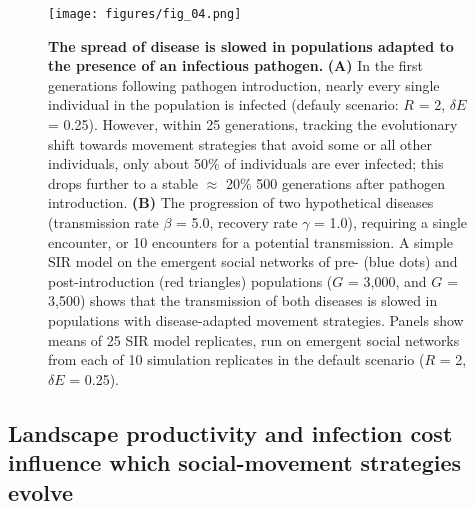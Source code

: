 \begin{figure}[!h]
    \centering
    \texttt{[image: figures/fig\_04.png]}
    \caption{
        \textbf{The spread of disease is slowed in populations adapted to the presence of an infectious pathogen.}
        \textbf{(A)} In the first generations following pathogen introduction, nearly every single individual in the population is infected (defauly scenario: $R$ = 2, $\delta E$ = 0.25).
        However, within 25 generations, tracking the evolutionary shift towards movement strategies that avoid some or all other individuals, only about 50\% of individuals are ever infected; this drops further to a stable $\approx$ 20\% 500 generations after pathogen introduction.
        \textbf{(B)} The progression of two hypothetical diseases (transmission rate $\beta$ = 5.0, recovery rate $\gamma$ = 1.0), requiring  a single encounter, or 10 encounters for a potential transmission.
        A simple SIR model on the emergent social networks of pre- (blue dots) and post-introduction (red triangles) populations ($G$ = 3,000, and $G$ = 3,500) shows that the transmission of both diseases is slowed in populations with disease-adapted movement strategies.
        Panels show means of 25 SIR model replicates, run on emergent social networks from each of 10 simulation replicates in the default scenario ($R$ = 2, $\delta E$ = 0.25).
    }\label{patho_fig_04}
\end{figure}

\subsection*{Landscape productivity and infection cost influence which social-movement strategies evolve}

